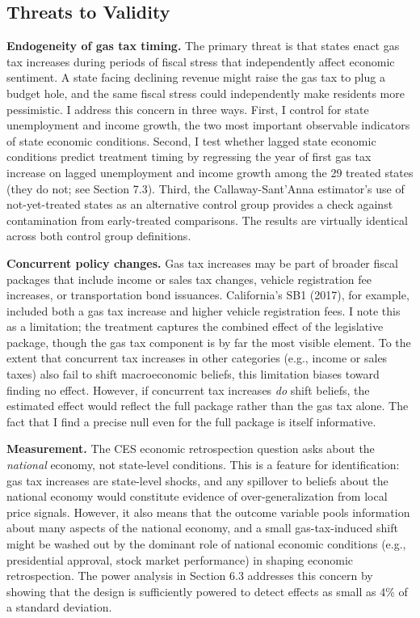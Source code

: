 \documentclass[12pt]{article}
\begin{document}
\subsection{Threats to Validity}

\textbf{Endogeneity of gas tax timing.} The primary threat is that states enact gas tax increases during periods of fiscal stress that independently affect economic sentiment. A state facing declining revenue might raise the gas tax to plug a budget hole, and the same fiscal stress could independently make residents more pessimistic. I address this concern in three ways. First, I control for state unemployment and income growth, the two most important observable indicators of state economic conditions. Second, I test whether lagged state economic conditions predict treatment timing by regressing the year of first gas tax increase on lagged unemployment and income growth among the 29 treated states (they do not; see Section 7.3). Third, the Callaway-Sant'Anna estimator's use of not-yet-treated states as an alternative control group provides a check against contamination from early-treated comparisons. The results are virtually identical across both control group definitions.

\textbf{Concurrent policy changes.} Gas tax increases may be part of broader fiscal packages that include income or sales tax changes, vehicle registration fee increases, or transportation bond issuances. California's SB1 (2017), for example, included both a gas tax increase and higher vehicle registration fees. I note this as a limitation; the treatment captures the combined effect of the legislative package, though the gas tax component is by far the most visible element. To the extent that concurrent tax increases in other categories (e.g., income or sales taxes) also fail to shift macroeconomic beliefs, this limitation biases toward finding no effect. However, if concurrent tax increases \textit{do} shift beliefs, the estimated effect would reflect the full package rather than the gas tax alone. The fact that I find a precise null even for the full package is itself informative.

\textbf{Measurement.} The CES economic retrospection question asks about the \textit{national} economy, not state-level conditions. This is a feature for identification: gas tax increases are state-level shocks, and any spillover to beliefs about the national economy would constitute evidence of over-generalization from local price signals. However, it also means that the outcome variable pools information about many aspects of the national economy, and a small gas-tax-induced shift might be washed out by the dominant role of national economic conditions (e.g., presidential approval, stock market performance) in shaping economic retrospection. The power analysis in Section 6.3 addresses this concern by showing that the design is sufficiently powered to detect effects as small as 4\% of a standard deviation.
\end{document}
